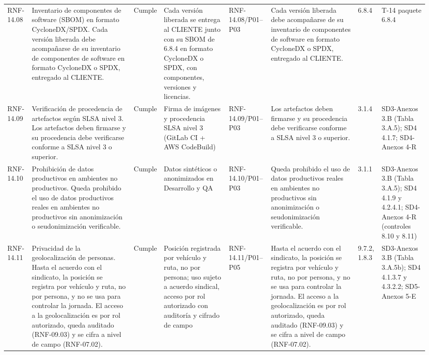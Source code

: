 \documentclass[oficio,firma,final]{lafrox}
\begin{document}
\begin{landscape}
{\begin{longtable}{@{}F{0.054} F{0.173} F{0.061} F{0.191} F{0.106} F{0.180} F{0.067} F{0.168}@{}}
  RNF-14.08 & Inventario de componentes de software (SBOM) en formato CycloneDX/SPDX. Cada versión liberada debe acompañarse de su inventario de componentes de software en formato CycloneDX o SPDX, entregado al CLIENTE. & Cumple & Cada versión liberada se entrega al CLIENTE junto con su SBOM de 6.8.4 en formato CycloneDX o SPDX, con componentes, versiones y licencias. & RNF-14.08/\allowbreak{}P01--\allowbreak{}P03 & Cada versión liberada debe acompañarse de su inventario de componentes de software en formato CycloneDX o SPDX, entregado al CLIENTE. & 6.8.4 & T-14 paquete 6.8.4  \\
  RNF-14.09 & Verificación de procedencia de artefactos según SLSA nivel 3. Los artefactos deben firmarse y su procedencia debe verificarse conforme a SLSA nivel 3 o superior. & Cumple & Firma de imágenes y procedencia SLSA nivel 3 (GitLab CI + AWS CodeBuild) & RNF-14.09/\allowbreak{}P01--\allowbreak{}P03 & Los artefactos deben firmarse y su procedencia debe verificarse conforme a SLSA nivel 3 o superior. & 3.1.4 & SD3-Anexos 3.B (Tabla 3.A.5); SD4 4.1.7; SD4-Anexos 4-R  \\
  RNF-14.10 & Prohibición de datos productivos en ambientes no productivos. Queda prohibido el uso de datos productivos reales en ambientes no productivos sin anonimización o seudonimización verificable. & Cumple & Datos sintéticos o anonimizados en Desarrollo y QA & RNF-14.10/\allowbreak{}P01--\allowbreak{}P03 & Queda prohibido el uso de datos productivos reales en ambientes no productivos sin anonimización o seudonimización verificable. & 3.1.1 & SD3-Anexos 3.B (Tabla 3.A.5); SD4 4.1.9 y 4.2.4.1; SD4-Anexos 4-R (controles 8.10 y 8.11)  \\
  RNF-14.11 & Privacidad de la geolocalización de personas. Hasta el acuerdo con el sindicato, la posición se registra por vehículo y ruta, no por persona, y no se usa para controlar la jornada. El acceso a la geolocalización es por rol autorizado, queda auditado (RNF-09.03) y se cifra a nivel de campo (RNF-07.02). & Cumple & Posición registrada por vehículo y ruta, no por persona; uso sujeto a acuerdo sindical, acceso por rol autorizado con auditoría y cifrado de campo & RNF-14.11/\allowbreak{}P01--\allowbreak{}P05 & Hasta el acuerdo con el sindicato, la posición se registra por vehículo y ruta, no por persona, y no se usa para controlar la jornada. El acceso a la geolocalización es por rol autorizado, queda auditado (RNF-09.03) y se cifra a nivel de campo (RNF-07.02). & 9.7.2, 1.8.3 & SD3-Anexos 3.B (Tabla 3.A.5b); SD4 4.1.3.7 y 4.3.2.2; SD5-Anexos 5-E  \\

\end{longtable}}
\end{landscape}
\end{document}
